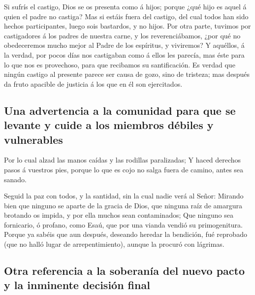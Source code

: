  Si sufrís el castigo, Dios se os presenta como á hijos;
porque ¿qué hijo es aquel á quien el padre no castiga?  Mas
si estáis fuera del castigo, del cual todos han sido hechos
participantes, luego sois bastardos, y no hijos.  Por otra
parte, tuvimos por castigadores á los padres de nuestra carne, y los
reverenciábamos, ¿por qué no obedeceremos mucho mejor al Padre de los
espíritus, y viviremos?  Y aquéllos, á la verdad, por pocos
días nos castigaban como á ellos les parecía, mas éste para lo que nos
es provechoso, para que recibamos su santificación.  Es
verdad que ningún castigo al presente parece ser causa de gozo, sino de
tristeza; mas después da fruto apacible de justicia á los que en él son
ejercitados.

\hypertarget{una-advertencia-a-la-comunidad-para-que-se-levante-y-cuide-a-los-miembros-duxe9biles-y-vulnerables}{%
\subsection{Una advertencia a la comunidad para que se levante y cuide a
los miembros débiles y
vulnerables}\label{una-advertencia-a-la-comunidad-para-que-se-levante-y-cuide-a-los-miembros-duxe9biles-y-vulnerables}}

 Por lo cual alzad las manos caídas y las rodillas
paralizadas;  Y haced derechos pasos á vuestros pies,
porque lo que es cojo no salga fuera de camino, antes sea sanado.

 Seguid la paz con todos, y la santidad, sin la cual nadie
verá al Señor:  Mirando bien que ninguno se aparte de la
gracia de Dios, que ninguna raíz de amargura brotando os impida, y por
ella muchos sean contaminados;  Que ninguno sea fornicario,
ó profano, como Esaú, que por una vianda vendió su primogenitura.
 Porque ya sabéis que aun después, deseando heredar la
bendición, fué reprobado (que no halló lugar de arrepentimiento), aunque
la procuró con lágrimas.

\hypertarget{otra-referencia-a-la-soberanuxeda-del-nuevo-pacto-y-la-inminente-decisiuxf3n-final}{%
\subsection{Otra referencia a la soberanía del nuevo pacto y la
inminente decisión
final}\label{otra-referencia-a-la-soberanuxeda-del-nuevo-pacto-y-la-inminente-decisiuxf3n-final}}

